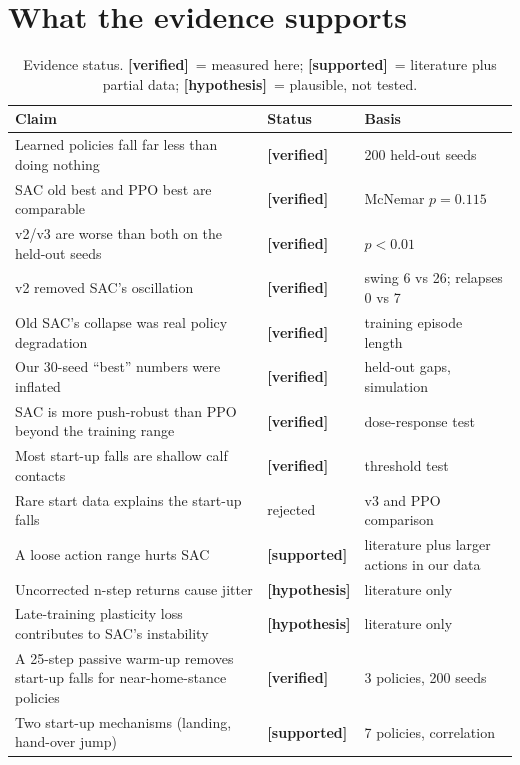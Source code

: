 \documentclass[11pt,a4paper]{article}
\newcommand{\tagv}{\textbf{[verified]}}
\newcommand{\tags}{\textbf{[supported]}}
\newcommand{\tagh}{\textbf{[hypothesis]}}
\begin{document}
\section{What the evidence supports}
\begin{table}[H]\centering\small
\begin{tabular}{@{}p{7.8cm}p{2.0cm}p{4.3cm}@{}}
\toprule Claim & Status & Basis\\\midrule
Learned policies fall far less than doing nothing & \tagv & 200 held-out seeds\\
SAC old best and PPO best are comparable & \tagv & McNemar $p=0.115$\\
v2/v3 are worse than both on the held-out seeds & \tagv & $p<0.01$\\
v2 removed SAC's oscillation & \tagv & swing 6 vs 26; relapses 0 vs 7\\
Old SAC's collapse was real policy degradation & \tagv & training episode length\\
Our 30-seed ``best'' numbers were inflated & \tagv & held-out gaps, simulation\\
SAC is more push-robust than PPO beyond the training range & \tagv & dose-response test\\
Most start-up falls are shallow calf contacts & \tagv & threshold test\\
Rare start data explains the start-up falls & rejected & v3 and PPO comparison\\
A loose action range hurts SAC & \tags & literature plus larger actions in our data\\
Uncorrected n-step returns cause jitter & \tagh & literature only\\
Late-training plasticity loss contributes to SAC's instability & \tagh & literature only \cite{plasticity}\\
A 25-step passive warm-up removes start-up falls for near-home-stance policies & \tagv & 3 policies, 200 seeds\\
Two start-up mechanisms (landing, hand-over jump) & \tags & 7 policies, correlation\\\bottomrule
\end{tabular}\caption{Evidence status. \tagv\ = measured here; \tags\ = literature plus partial data; \tagh\ = plausible, not tested.}\end{table}
\end{document}

